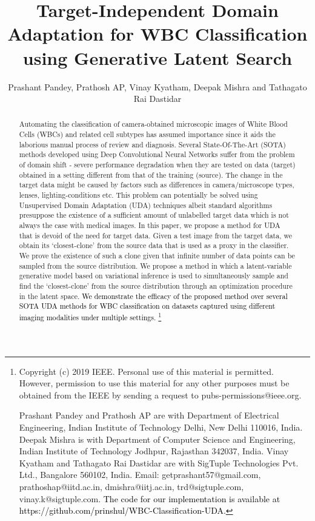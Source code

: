 \documentclass[journal,twoside,web]{IEEEtran}
\newcommand\blfootnote[1]{\begingroup
  \renewcommand\thefootnote{}\footnote{#1}\addtocounter{footnote}{-1}\endgroup
}
\newcommand{\bb}{\textcolor{black}}
\begin{document}
\title{Target-Independent Domain Adaptation for WBC Classification using Generative Latent Search}
 \author{
Prashant Pandey, Prathosh AP, Vinay Kyatham, Deepak Mishra and 
Tathagato Rai Dastidar
}
\date{}
\maketitle


\setlength{\dbltextfloatsep}{0.3cm}
\begin{abstract}

Automating the classification of camera-obtained microscopic images of White Blood Cells (WBCs) and related cell subtypes has assumed importance since it aids the laborious manual process of review and diagnosis. Several State-Of-The-Art (SOTA) methods developed using Deep Convolutional Neural Networks suffer from the problem of domain shift - severe performance degradation  when they are tested on data (target) obtained in a setting different from that of the training (source). The change in the target data might be caused by factors such as differences in camera/microscope types, lenses, lighting-conditions etc. This problem can potentially be solved using Unsupervised Domain Adaptation (UDA) techniques albeit standard algorithms presuppose the existence of a sufficient amount of unlabelled target data which is not always the case with medical images. In this paper, we propose a method for UDA that is devoid of the need for target data.
Given a test image from the target data, we obtain its `closest-clone' from the source data that is used as a proxy in the classifier. We prove the existence of such a clone given that infinite number of data points can be sampled from the source distribution.
We propose a method in which a latent-variable generative model based on variational inference is used to simultaneously sample and find the `closest-clone' from the source distribution through an optimization procedure in the latent space. \bb{We demonstrate the efficacy of the proposed method over several SOTA UDA methods for WBC classification on datasets captured using different imaging modalities under multiple settings.}
\blfootnote
{Copyright (c) 2019 IEEE. Personal use of this material is permitted. However, permission to use this material for any other purposes must be obtained from the IEEE by sending a request to pubs-permissions@ieee.org. 

Prashant Pandey and Prathosh AP are with Department of Electrical Engineering, Indian Institute of Technology Delhi, New Delhi 110016, India. Deepak Mishra is with Department of Computer Science and Engineering, Indian Institute of Technology Jodhpur, Rajasthan 342037, India. Vinay Kyatham and Tathagato Rai Dastidar are with SigTuple Technologies Pvt. Ltd., Bangalore 560102, India. Email: getprashant57@gmail.com, prathoshap@iitd.ac.in, dmishra@iitj.ac.in, trd@sigtuple.com, vinay.k@sigtuple.com. \bb{The code for our implementation is available at https://github.com/prinshul/WBC-Classification-UDA.}
}


\end{abstract}
\end{document}
